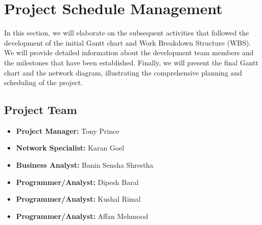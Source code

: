 \chapter{Project Schedule Management}
In this section, we will elaborate on the subsequent activities that followed the development of the initial Gantt chart and Work Breakdown Structure (WBS). We will provide detailed information about the development team members and the milestones that have been established. Finally, we will present the final Gantt chart and the network diagram, illustrating the comprehensive planning and scheduling of the project.


\section{Project Team}
\begin{itemize}
    \item \textbf{Project Manager:} Tony Prince
    \item \textbf{Network Specialist:} Karan Goel
    \item \textbf{Business Analyst:} Banin Sensha Shrestha
    \item \textbf{Programmer/Analyst:} Dipesh Baral
    \item \textbf{Programmer/Analyst:} Kushal Rimal
    \item \textbf{Programmer/Analyst:} Affan Mehmood
\end{itemize}


